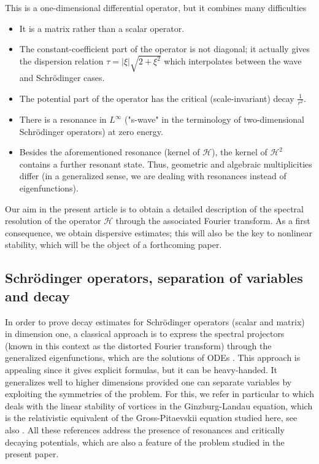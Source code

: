 \documentclass[11 pt]{amsart}
\theoremstyle{definition}
\theoremstyle{remark}
\numberwithin{equation}{section}
\begin{document}
This is a one-dimensional differential operator, but it combines many difficulties
\begin{itemize}
\item It is a matrix rather than a scalar operator.
\item The constant-coefficient part of the operator is not diagonal;  it actually gives the dispersion relation $\tau = |\xi|\sqrt{2 + \xi^2}$ which interpolates between the wave and Schr\"odinger cases.
\item The potential part of the operator has the critical (scale-invariant) decay $\frac{1}{r^2}$.
\item There is a resonance in $L^\infty$ ("s-wave" in the terminology of two-dimensional Schr\"odinger operators) at zero energy. 
\item Besides the aforementioned resonance (kernel of $\mathcal{H}$), the kernel of $\mathcal{H}^2$ contains a further resonant state. Thus, geometric and algebraic multiplicities differ (in a generalized sense, we are dealing with resonances instead of eigenfunctions).
\end{itemize}

Our aim in the present article is to obtain a detailed description of the spectral resolution of the operator $\mathcal{H}$ through the associated Fourier transform. As a first consequence, we obtain dispersive estimates; this will also be the key to nonlinear stability, which will be the object of a forthcoming paper.

\subsection{Schr\"odinger operators, separation of variables and decay}

In order to prove decay estimates for Schr\"odinger operators (scalar and matrix) in dimension one, a classical approach is to express the spectral projectors (known in this context as the distorted Fourier transform) through the generalized eigenfunctions, which are the solutions of ODEs \cite{BuslaevPerelman,GoldbergSchlag,KriegerSchlag}. This approach is appealing since it gives explicit formulas, but it can be heavy-handed. It generalizes well to higher dimensions provided one can separate variables by exploiting the symmetries of the problem. For this, we refer in particular to \cite{PalaciosPusateri} which deals with the linear stability of vortices in the Ginzburg-Landau equation, which is the relativistic equivalent of the Gross-Pitaevskii equation studied here, see also \cite{SchlagSofferStaubach1,SchlagSofferStaubach2}. All these references address the presence of resonances and critically decaying potentials, which are also a feature of the problem studied in the present paper.
\end{document}
